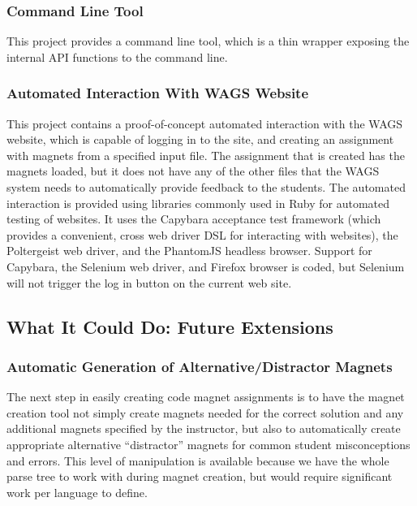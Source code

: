 \documentclass[letter,10pt,final]{article}
\begin{document}
\subsubsection{Command Line Tool}

This project provides a command line tool, which is a thin wrapper 
exposing the internal API functions to the command line.


\subsubsection{Automated Interaction With WAGS Website}

This project contains a proof-of-concept automated interaction with the 
WAGS website, which is capable of logging in to the site, and creating 
an assignment with magnets from a specified input file. The assignment 
that is created has the magnets loaded, but it does not have any of the 
other files that the WAGS system needs to automatically provide 
feedback to the students. The automated interaction is provided using 
libraries commonly used in Ruby for automated testing of websites. It 
uses the Capybara acceptance test framework (which provides a 
convenient, cross web driver DSL for interacting with websites), the 
Poltergeist web driver, and the PhantomJS headless browser. Support for 
Capybara, the Selenium web driver, and Firefox browser is coded, but 
Selenium will not trigger the log in button on the current web site.


\subsection{What It Could Do: Future Extensions}

\subsubsection{Automatic Generation of Alternative/Distractor Magnets}

The next step in easily creating code magnet assignments is to have the 
magnet creation tool not simply create magnets needed for the correct 
solution and any additional magnets specified by the instructor, but 
also to automatically create appropriate alternative ``distractor'' 
magnets for common student misconceptions and errors. This level of 
manipulation is available because we have the whole parse tree to work 
with during magnet creation, but would require significant work per 
language to define.
\end{document}
